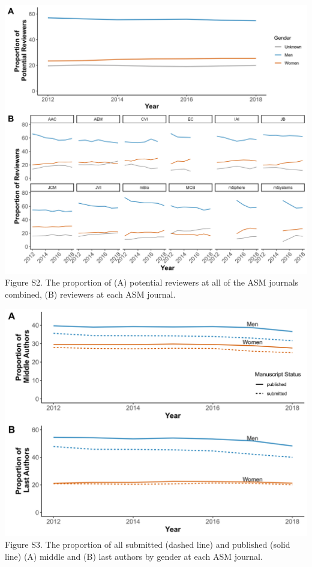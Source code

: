 \documentclass[11pt,]{article}
\begin{document}
\includegraphics{Figure_S2.png} Figure S2. The proportion of (A)
potential reviewers at all of the ASM journals combined, (B) reviewers
at each ASM journal.

\newpage

\includegraphics{Figure_S3.png} Figure S3. The proportion of all
submitted (dashed line) and published (solid line) (A) middle and (B)
last authors by gender at each ASM journal.

\newpage
\end{document}
